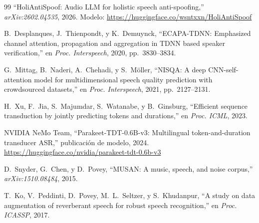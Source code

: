 \documentclass[11pt]{article}
\begin{document}
\begin{thebibliography}{99}
``HoliAntiSpoof: Audio LLM for holistic speech anti-spoofing,''
\emph{arXiv:2602.04535}, 2026.
Modelo: \url{https://huggingface.co/wsntxxn/HoliAntiSpoof}

B.~Desplanques, J.~Thienpondt, y K.~Demuynck,
``ECAPA-TDNN: Emphasized channel attention, propagation and aggregation
in TDNN based speaker verification,''
en \emph{Proc. Interspeech}, 2020, pp.~3830--3834.

G.~Mittag, B.~Naderi, A.~Chehadi, y S.~M\"oller,
``NISQA: A deep CNN-self-attention model for multidimensional speech
quality prediction with crowdsourced datasets,''
en \emph{Proc. Interspeech}, 2021, pp.~2127--2131.

H.~Xu, F.~Jia, S.~Majumdar, S.~Watanabe, y B.~Ginsburg,
``Efficient sequence transduction by jointly predicting tokens and
durations,'' en \emph{Proc. ICML}, 2023.

NVIDIA NeMo Team,
``Parakeet-TDT-0.6B-v3: Multilingual token-and-duration transducer ASR,''
publicaci\'on de modelo, 2024.
\url{https://huggingface.co/nvidia/parakeet-tdt-0.6b-v3}

D.~Snyder, G.~Chen, y D.~Povey,
``MUSAN: A music, speech, and noise corpus,'' \emph{arXiv:1510.08484},
2015.

T.~Ko, V.~Peddinti, D.~Povey, M.~L.~Seltzer, y S.~Khudanpur,
``A study on data augmentation of reverberant speech for robust speech
recognition,'' en \emph{Proc. ICASSP}, 2017.

\end{thebibliography}
\end{document}
